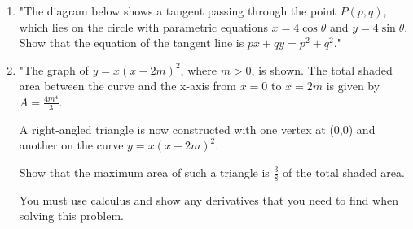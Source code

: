 \documentclass{article}
\begin{document}
\begin{enumerate}
\vspace{3cm}
\item "The diagram below shows a tangent passing through the point \( P(p, q) \), which lies on the circle with parametric equations \( x = 4 \cos \theta \) and \( y = 4 \sin \theta \). Show that the equation of the tangent line is \( px + qy = p^2 + q^2 \)."
\vspace{3cm}
\item "The graph of \( y = x(x - 2m)^2 \), where \( m > 0 \), is shown. The total shaded area between the curve and the x-axis from \( x = 0 \) to \( x = 2m \) is given by \( A = \frac{4m^4}{3} \).

A right-angled triangle is now constructed with one vertex at (0,0) and another on the curve \( y = x(x - 2m)^2 \).

Show that the maximum area of such a triangle is \( \frac{3}{8} \) of the total shaded area.

You must use calculus and show any derivatives that you need to find when solving this problem.


\end{enumerate}
\end{document}
